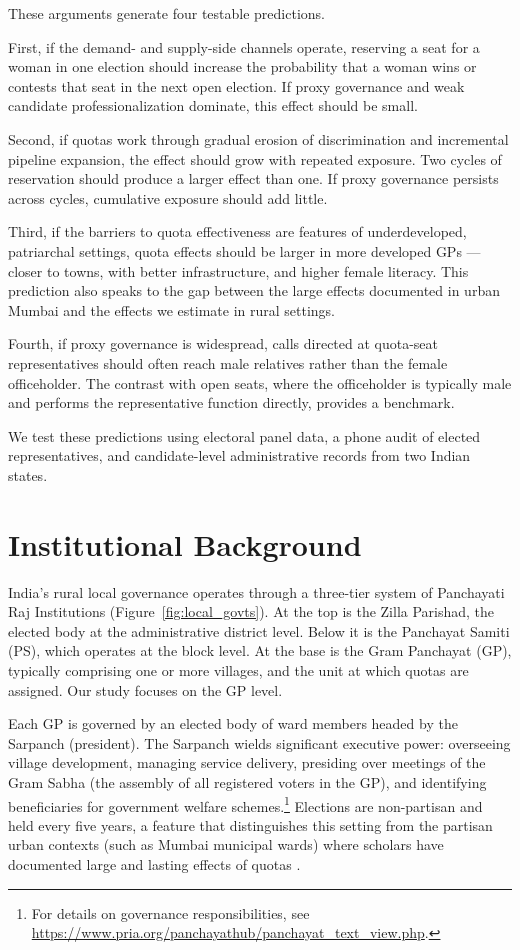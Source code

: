 \documentclass[12pt]{article}
\begin{document}
These arguments generate four testable predictions.

First, if the demand- and supply-side channels operate, reserving a seat for a woman in one election should increase the probability that a woman wins or contests that seat in the next open election. If proxy governance and weak candidate professionalization dominate, this effect should be small.

Second, if quotas work through gradual erosion of discrimination and incremental pipeline expansion, the effect should grow with repeated exposure. Two cycles of reservation should produce a larger effect than one. If proxy governance persists across cycles, cumulative exposure should add little.

Third, if the barriers to quota effectiveness are features of underdeveloped, patriarchal settings, quota effects should be larger in more developed GPs --- closer to towns, with better infrastructure, and higher female literacy. This prediction also speaks to the gap between the large effects documented in urban Mumbai \citep{bhavnani2009electoral} and the effects we estimate in rural settings.

Fourth, if proxy governance is widespread, calls directed at quota-seat representatives should often reach male relatives rather than the female officeholder. The contrast with open seats, where the officeholder is typically male and performs the representative function directly, provides a benchmark.

We test these predictions using electoral panel data, a phone audit of elected representatives, and candidate-level administrative records from two Indian states.

\section{Institutional Background}\label{sec:background}

India's rural local governance operates through a three-tier system of Panchayati Raj Institutions (Figure~\ref{fig:local_govts}). At the top is the Zilla Parishad, the elected body at the administrative district level. Below it is the Panchayat Samiti (PS), which operates at the block level. At the base is the Gram Panchayat (GP), typically comprising one or more villages, and the unit at which quotas are assigned. Our study focuses on the GP level.

Each GP is governed by an elected body of ward members headed by the Sarpanch (president). The Sarpanch wields significant executive power: overseeing village development, managing service delivery, presiding over meetings of the Gram Sabha (the assembly of all registered voters in the GP), and identifying beneficiaries for government welfare schemes.\footnote{For details on governance responsibilities, see \url{https://www.pria.org/panchayathub/panchayat_text_view.php}.} Elections are non-partisan and held every five years, a feature that distinguishes this setting from the partisan urban contexts (such as Mumbai municipal wards) where scholars have documented large and lasting effects of quotas \citep{bhavnani2009electoral}.
\end{document}
